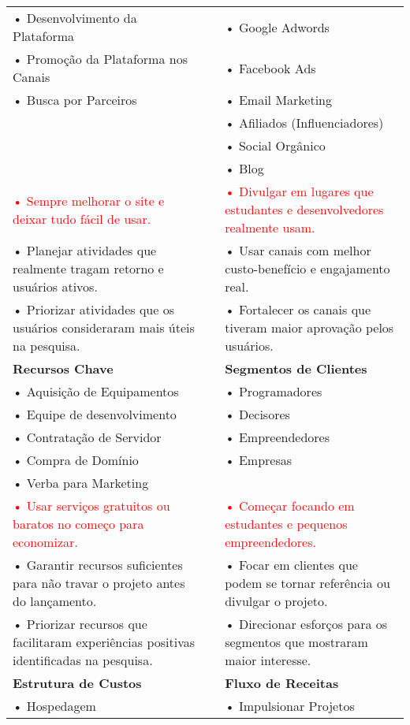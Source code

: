 \documentclass{article}
\begin{document}
\begin{table}[h!]
\begin{tabular}{|p{6cm}|p{6cm}|p{6cm}|}
\cline{1-1}\cline{2-2}\cline{3-3}
• Desenvolvimento da Plataforma & & • Google Adwords \\
• Promoção da Plataforma nos Canais & & • Facebook Ads \\
• Busca por Parceiros & & • Email Marketing \\
& & • Afiliados (Influenciadores) \\
& & • Social Orgânico \\
& & • Blog \\
\textcolor{red}{• Sempre melhorar o site e deixar tudo fácil de usar.} & 
& 
\textcolor{red}{• Divulgar em lugares que estudantes e desenvolvedores realmente usam.} \\
\textcolor{blueval}{• Planejar atividades que realmente tragam retorno e usuários ativos.} &
& 
\textcolor{blueval}{• Usar canais com melhor custo-benefício e engajamento real.} \\
\textcolor{greenval}{• Priorizar atividades que os usuários consideraram mais úteis na pesquisa.} &
&
\textcolor{greenval}{• Fortalecer os canais que tiveram maior aprovação pelos usuários.} \\
\hline
\rowcolor{lightgray}
\textbf{Recursos Chave} & & \textbf{Segmentos de Clientes} \\
\cline{1-1}\cline{2-2}\cline{3-3}
• Aquisição de Equipamentos & & • Programadores \\
• Equipe de desenvolvimento & & • Decisores \\
• Contratação de Servidor & & • Empreendedores \\
• Compra de Domínio & & • Empresas \\
• Verba para Marketing & & \\
\textcolor{red}{• Usar serviços gratuitos ou baratos no começo para economizar.} &
& 
\textcolor{red}{• Começar focando em estudantes e pequenos empreendedores.} \\
\textcolor{blueval}{• Garantir recursos suficientes para não travar o projeto antes do lançamento.} &
& 
\textcolor{blueval}{• Focar em clientes que podem se tornar referência ou divulgar o projeto.} \\
\textcolor{greenval}{• Priorizar recursos que facilitaram experiências positivas identificadas na pesquisa.} &
&
\textcolor{greenval}{• Direcionar esforços para os segmentos que mostraram maior interesse.} \\
\hline
\rowcolor{lightgray}
\textbf{Estrutura de Custos} & & \textbf{Fluxo de Receitas} \\
\hline
• Hospedagem & & • Impulsionar Projetos \\

\end{tabular}
\end{table}
\end{document}
